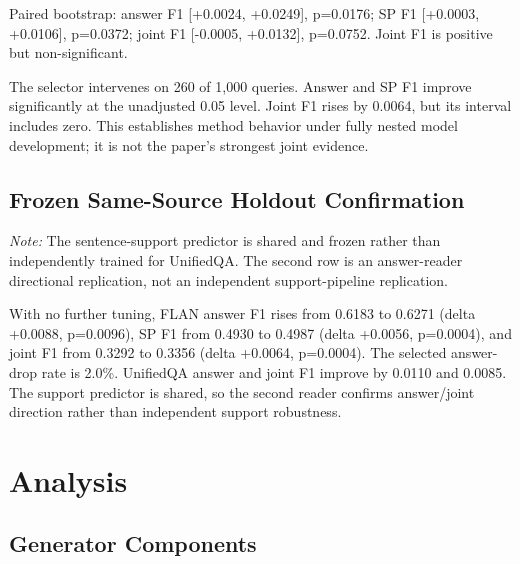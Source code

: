 \documentclass[10pt,twocolumn]{article}
\begin{document}
Paired bootstrap: answer F1 [+0.0024, +0.0249], p=0.0176; SP F1 [+0.0003, +0.0106], p=0.0372; joint F1 [-0.0005, +0.0132], p=0.0752. Joint F1 is positive but non-significant.

The selector intervenes on 260 of 1,000 queries. Answer and SP F1 improve significantly at the unadjusted 0.05 level. Joint F1 rises by 0.0064, but its interval includes zero. This establishes method behavior under fully nested model development; it is not the paper's strongest joint evidence.

\subsection{Frozen Same-Source Holdout Confirmation}

\begin{table}[t]
\centering
\small
\caption{Frozen 3,000-query same-source holdout}
\label{tab:2}
\end{table}

\noindent\textit{Note:} The sentence-support predictor is shared and frozen rather than independently trained for UnifiedQA. The second row is an answer-reader directional replication, not an independent support-pipeline replication.

With no further tuning, FLAN answer F1 rises from 0.6183 to 0.6271 (delta +0.0088, p=0.0096), SP F1 from 0.4930 to 0.4987 (delta +0.0056, p=0.0004), and joint F1 from 0.3292 to 0.3356 (delta +0.0064, p=0.0004). The selected answer-drop rate is 2.0\%. UnifiedQA answer and joint F1 improve by 0.0110 and 0.0085. The support predictor is shared, so the second reader confirms answer/joint direction rather than independent support robustness.

\section{Analysis}

\subsection{Generator Components}
\end{document}
